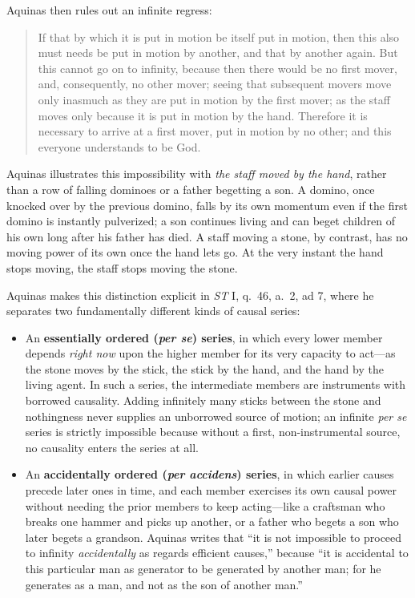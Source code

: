 Aquinas then rules out an infinite regress:

\begin{quote}
If that by which it is put in motion be itself put in motion, then this also must needs be put in motion by another, and that by another again. But this cannot go on to infinity, because then there would be no first mover, and, consequently, no other mover; seeing that subsequent movers move only inasmuch as they are put in motion by the first mover; as the staff moves only because it is put in motion by the hand. Therefore it is necessary to arrive at a first mover, put in motion by no other; and this everyone understands to be God.
\end{quote}

Aquinas illustrates this impossibility with \emph{the staff moved by the hand}, rather than a row of falling dominoes or a father begetting a son. A domino, once knocked over by the previous domino, falls by its own momentum even if the first domino is instantly pulverized; a son continues living and can beget children of his own long after his father has died. A staff moving a stone, by contrast, has no moving power of its own once the hand lets go. At the very instant the hand stops moving, the staff stops moving the stone.

Aquinas makes this distinction explicit in \emph{ST} I, q.\ 46, a.\ 2, ad 7, where he separates two fundamentally different kinds of causal series:

\begin{itemize}
\item An \textbf{essentially ordered (\emph{per se}) series}, in which every lower member depends \emph{right now} upon the higher member for its very capacity to act---as the stone moves by the stick, the stick by the hand, and the hand by the living agent. In such a series, the intermediate members are instruments with borrowed causality. Adding infinitely many sticks between the stone and nothingness never supplies an unborrowed source of motion; an infinite \emph{per se} series is strictly impossible because without a first, non-instrumental source, no causality enters the series at all.
\item An \textbf{accidentally ordered (\emph{per accidens}) series}, in which earlier causes precede later ones in time, and each member exercises its own causal power without needing the prior members to keep acting---like a craftsman who breaks one hammer and picks up another, or a father who begets a son who later begets a grandson. Aquinas writes that ``it is not impossible to proceed to infinity \emph{accidentally} as regards efficient causes,'' because ``it is accidental to this particular man as generator to be generated by another man; for he generates as a man, and not as the son of another man.''
\end{itemize}


